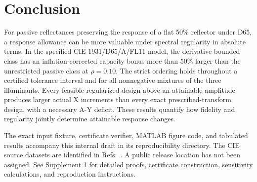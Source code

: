 \documentclass{optica-article}
\begin{document}
\section{Conclusion}
For passive reflectances preserving the response of a flat 50\% reflector under D65, a response allowance can be more valuable under spectral regularity in absolute terms. In the specified CIE 1931/D65/A/FL11 model, the derivative-bounded class has an inflation-corrected capacity bonus more than 50\% larger than the unrestricted passive class at $\rho=0.10$. The strict ordering holds throughout a certified tolerance interval and for all nonnegative mixtures of the three illuminants. Every feasible regularized design above an attainable amplitude produces larger actual X increments than every exact prescribed-transform design, with a necessary A-Y deficit. These results quantify how fidelity and regularity jointly determine attainable response changes.

\begin{backmatter}

The exact input fixture, certificate verifier, MATLAB figure code, and tabulated results accompany this internal draft in its reproducibility directory. The CIE source datasets are identified in Refs.~\cite{CIEObserver,CIED65,CIEA,CIEFL}. A public release location has not been assigned.
See Supplement 1 for detailed proofs, certificate construction, sensitivity calculations, and reproduction instructions.
\end{backmatter}

\end{document}
